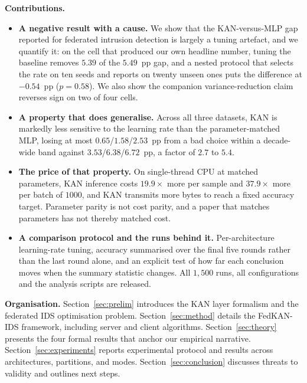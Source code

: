 \textbf{Contributions.}
\begin{itemize}
\item \textbf{A negative result with a cause.} We show that the KAN-versus-MLP gap reported
for federated intrusion detection is largely a tuning artefact, and we quantify it: on the
cell that produced our own headline number, tuning the baseline removes $5.39$ of the $5.49$~pp gap, and a nested protocol that selects the rate on ten seeds and reports on twenty unseen ones puts the difference at $-0.54$~pp ($p=0.58$). We also show the companion variance-reduction claim reverses sign on two of
four cells.
\item \textbf{A property that does generalise.} Across all three datasets, KAN is markedly
less sensitive to the learning rate than the parameter-matched MLP, losing at most
$0.65$/$1.58$/$2.53$~pp from a bad choice within a decade-wide band against
$3.53$/$6.38$/$6.72$~pp, a factor of $2.7$ to $5.4$.
\item \textbf{The price of that property.} On single-thread CPU at matched parameters, KAN
inference costs $19.9\times$ more per sample and $37.9\times$ more per batch of $1000$, and
KAN transmits more bytes to reach a fixed accuracy target. Parameter parity is not cost
parity, and a paper that matches parameters has not thereby matched cost.
\item \textbf{A comparison protocol and the runs behind it.} Per-architecture learning-rate
tuning, accuracy summarised over the final five rounds rather than the last round alone, and
an explicit test of how far each conclusion moves when the summary statistic changes. All
$1{,}500$ runs, all configurations and the analysis scripts are released.
\end{itemize}

\textbf{Organisation.} Section~\ref{sec:prelim} introduces the KAN layer formalism and the federated IDS optimisation problem. Section~\ref{sec:method} details the FedKAN-IDS framework, including server and client algorithms. Section~\ref{sec:theory} presents the four formal results that anchor our empirical narrative. Section~\ref{sec:experiments} reports experimental protocol and results across architectures, partitions, and modes. Section~\ref{sec:conclusion} discusses threats to validity and outlines next steps.
